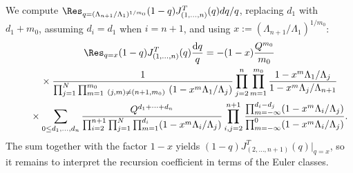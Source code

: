 We compute $\Res_{q=(\Lambda_{n+1}/\Lambda_1)^{1/m_0}} (1-q)J^T_{(1,\dots,n)}(q)dq/q$, replacing $d_1$ with $d_1+m_0$, assuming $d_i=d_1$ when $i=n+1$, and using $x:= (\Lambda_{n+1}/\Lambda_1)^{1/m_0}$:
\begin{gather*}
\Res_{q=x} (1-q)J^T_{(1,\dots,n)}(q)\frac{{\rm d}q}{q} = -(1-x)\frac{Q^{m_0}}{m_0}
\\ \qquad
{}\times\frac{1}{\prod_{j=1}^N\prod_{m=1}^{m_0}\,_{(j,m)\neq (n+1,m_0)}\ (1-x^m\Lambda_1/\Lambda_j)} \prod_{j=2}^n\prod_{m=1}^{m_0}\frac{1-x^m\Lambda_1/\Lambda_j}{1-x^m\Lambda_j/\Lambda_{n+1}}
\\ \qquad
{}\times\sum_{0\leq d_1,\dots,d_n}\frac{Q^{d_1+\cdots+d_n}}{\prod_{i=2}^{n+1}\prod_{j=1}^N\prod_{m=1}^{d_i}
(1-x^m\Lambda_i/\Lambda_j)} \prod_{i,j=2}^{n+1}\frac{\prod_{m=-\infty}^{d_i-d_j}
(1-x^m\Lambda_i/\Lambda_j)}{\prod_{m=-\infty}^0(1-x^m\Lambda_i/\Lambda_j)}.
\end{gather*}
The sum together with the factor $1-x$ yields $(1-q)J^T_{(2,\dots,n+1)}(q)|_{q=x}$, so it remains to interpret the recursion coefficient in terms of the Euler classes.

